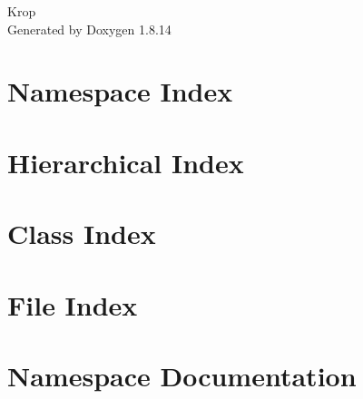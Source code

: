 \documentclass[twoside]{book}
\newcommand{\+}{\discretionary{\mbox{\scriptsize$\hookleftarrow$}}{}{}}
\newcommand{\clearemptydoublepage}{%
  \newpage{\pagestyle{empty}\cleardoublepage}%
}
\begin{document}
\hypersetup{pageanchor=false,
             bookmarksnumbered=true,
             pdfencoding=unicode
            }
\begin{titlepage}
\vspace*{7cm}
\begin{center}%
{\Large Krop }\\
\vspace*{1cm}
{\large Generated by Doxygen 1.8.14}\\
\end{center}
\end{titlepage}
\clearemptydoublepage
{}
\tableofcontents
\clearemptydoublepage
{}
\hypersetup{pageanchor=true}

\chapter{Namespace Index}

\chapter{Hierarchical Index}

\chapter{Class Index}

\chapter{File Index}

\chapter{Namespace Documentation}











\end{document}
